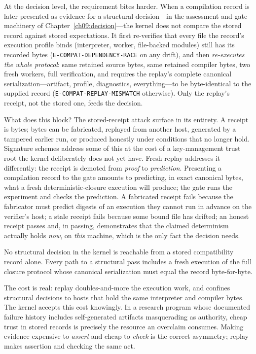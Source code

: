 At the decision level, the requirement bites harder. When a compilation record is later presented as evidence for a structural decision---in the assessment and gate machinery of Chapter~\ref{ch09:decision}---the kernel does not compare the stored record against stored expectations. It first re-verifies that every file the record's execution profile binds (interpreter, worker, file-backed modules) still has its recorded bytes (\texttt{E-COMPAT-DEPENDENCY-RACE} on any drift), and then \emph{re-executes the whole protocol}: same retained source bytes, same retained compiler bytes, two fresh workers, full verification, and requires the replay's complete canonical serialization---artifact, profile, diagnostics, everything---to be byte-identical to the supplied record (\texttt{E-COMPAT-REPLAY-MISMATCH} otherwise). Only the replay's receipt, not the stored one, feeds the decision.

What does this block? The stored-receipt attack surface in its entirety. A receipt is bytes; bytes can be fabricated, replayed from another host, generated by a tampered earlier run, or produced honestly under conditions that no longer hold. Signature schemes address some of this at the cost of a key-management trust root the kernel deliberately does not yet have. Fresh replay addresses it differently: the receipt is demoted from \emph{proof} to \emph{prediction}. Presenting a compilation record to the gate amounts to predicting, in exact canonical bytes, what a fresh deterministic-closure execution will produce; the gate runs the experiment and checks the prediction. A fabricated receipt fails because the fabricator must predict digests of an execution they cannot run in advance on the verifier's host; a stale receipt fails because some bound file has drifted; an honest receipt passes and, in passing, demonstrates that the claimed determinism actually holds \emph{now}, on \emph{this} machine, which is the only fact the decision needs.

\begin{invariant}\label{ch07:inv:replay}
No structural decision in the kernel is reachable from a stored compatibility record alone. Every path to a structural pass includes a fresh execution of the full closure protocol whose canonical serialization must equal the record byte-for-byte.
\end{invariant}

The cost is real: replay doubles-and-more the execution work, and confines structural decisions to hosts that hold the same interpreter and compiler bytes. The kernel accepts this cost knowingly. In a research program whose documented failure history includes self-generated artifacts masquerading as authority, cheap trust in stored records is precisely the resource an overclaim consumes. Making evidence expensive to \emph{assert} and cheap to \emph{check} is the correct asymmetry; replay makes assertion and checking the same act.

